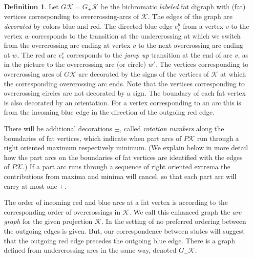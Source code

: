 \documentclass[11pt]{article}
\theoremstyle{definition}
\newtheorem{defn}{Definition}[section]
\theoremstyle{remark}
\theoremstyle{remark}
\begin{document}
\begin{defn} \label{defn:arc-graph} Let $G\mathcal{K}=G_+\mathcal{K}$ be the bichromatic \textit{labeled} fat digraph with (fat) vertices corresponding to overcrossing-arcs of $\mathcal{K}$. The edges of the graph are \textit{decorated} by colors blue and red. 
The directed blue edge $e_v^b$ from a vertex $v$ to the vertex $w$ corresponds to the transition at the undercrossing at which we switch from the overcrossing arc ending at vertex $v$ to the next overcrossing arc ending at $w$. The red arc $e_v^r$ corresponds to the \textit{jump up} transition at the end of arc $v$, as  in the picture to the overcrossing arc (or circle) $w'$.  The vertices corresponding to overcrossing arcs of $G\mathcal{K}$ are decorated by the signs of the vertices of $\mathcal{K}$ at which the corresponding overcrossing arc ends. 
Note that the vertices corresponding to overcrossing circles are not decorated by a sign. 
The boundary of each fat vertex is also decorated by an orientation. For a vertex corresponding to an arc this is from 
the incoming blue edge in the direction of the outgoing red edge. 

There will be additional decorations $\pm $, called \textit{rotation numbers} along the boundaries of fat vertices, which indicate when part arcs of $P\mathcal{K}$ run through a right oriented maximum respectively minimum. 
(We explain below in more detail how the part arcs on the boundaries of fat vertices are identified with the edges of $P\mathcal{K}$.) 
If a part arc runs through a sequence of right oriented extrema the contributions from maxima and minima will cancel, so that each part arc will carry at most one $\pm $. 

The order of incoming red and blue arcs at a fat vertex is according to the corresponding order of overcrossings in $\mathcal{K}$. We call this enhanced graph the \textit{arc graph} for the given projection $\mathcal{K}$. In the setting of \cite{GL} no preferred ordering between the outgoing edges is given. But, our correspondence between states will suggest that the outgoing red edge precedes the outgoing blue edge. 
There is a graph defined from undercrossing arcs in the same way, denoted $G_-\mathcal{K}$.
\end{defn}
\end{document}
